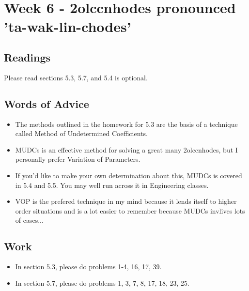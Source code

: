 	\clearpage



	\section{Week 6 - 2olccnhodes pronounced 'ta-wak-lin-chodes'}

	\subsection{Readings}
		Please read sections 5.3, 5.7, and 5.4 is optional.

	\subsection{Words of Advice}
		\begin{itemize}
			\item The methods outlined in the homework for 5.3 are the basis of a technique called Method of Undetermined Coefficients.
			\item MUDCs is an effective method for solving a great many 2olccnhodes, but I personally prefer Variation of Parameters.
			\item If you'd like to make your own determination about this, MUDCs is covered in 5.4 and 5.5. You may well run across it in Engineering classes.
			\item VOP is the prefered technique in my mind because it lends itself to higher order situations and is a lot easier to remember because MUDCs invlives lots of cases...
		\end{itemize}

	\subsection{Work}
		\begin{itemize}
			\item In section 5.3, please do problems 1-4, 16, 17, 39.
			\item In section 5.7, please do problems 1, 3, 7, 8, 17, 18, 23, 25.
		\end{itemize}

	\clearpage



